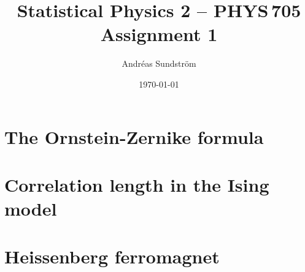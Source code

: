 \documentclass[11pt,letter, swedish, english
]{article}
\begin{document}




\title{Statistical Physics 2 -- PHYS\,705 \\
Assignment 1}
\author{Andréas Sundström}
\date{\today}

\maketitle


\section{The Ornstein-Zernike formula}


\section{Correlation length in the Ising model}


\section{Heissenberg ferromagnet}
\end{document}
